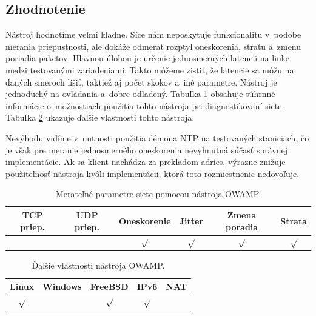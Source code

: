         \subsection{Zhodnotenie} \label{owamp_zhod}
        Nástroj hodnotíme veľmi kladne. Síce nám neposkytuje funkcionalitu
        v~podobe merania priepustnosti, ale dokáže odmerať rozptyl oneskorenia, stratu
        a~zmenu poriadia paketov. Hlavnou úlohou je určenie jednosmerných
        latencií na linke medzi testovanými zariadeniami. Takto môžeme zistiť,
        že latencie sa môžu na daných smeroch líšiť, taktiež aj počet skokov
        a~iné parametre. Nástroj je jednoduchý na ovládania a~dobre 
        odladený. Tabuľka \ref{tab_owamp_param} obsahuje súhrnné informácie
        o~možnostiach použitia tohto nástroja pri diagnostikovaní siete.
        Tabuľka \ref{tab_owamp_vlast} ukazuje ďalšie vlastnosti
        tohto nástroja.

        Nevýhodu vidíme v~nutnosti použitia démona NTP na
        testovaných staniciach, čo je však pre meranie jednosmerného
        oneskorenia nevyhnutná súčasť správnej implementácie.
        Ak sa klient nachádza za prekladom adries, výrazne znižuje použiteľnosť
        nástroja kvôli implementácii, ktorá toto rozmiestnenie nedovoľuje.

        \begin{table}[H]
            \begin{center}
                \begin{tabular}{|c|c|c|c|c|c|}
                    \hline
                    \textbf{TCP priep.}  &  \textbf{UDP priep.}  &
                    \textbf{Oneskorenie} & \textbf{Jitter} &
                    \textbf{Zmena poradia} & \textbf{Strata} \\
                    \hline
                    & & $\surd$ & $\surd$ &  $\surd$ & $\surd$\\ 
                    \hline
                \end{tabular}
                \caption{Merateľné parametre siete pomocou nástroja OWAMP.}
                \label{tab_owamp_param}
            \end{center}
        \end{table}

        \begin{table}[H]
            \begin{center}
                \begin{tabular}{|c|c|c|c|c|}
                    \hline
                    \textbf{Linux}  &  \textbf{Windows}  &
                    \textbf{FreeBSD} & \textbf{IPv6} &
                    \textbf{NAT} \\
                    \hline
                    $\surd$ & & $\surd$ & $\surd$ &  \\ 
                    \hline
                \end{tabular}
                \caption{Ďalšie vlastnosti nástroja OWAMP.}
                \label{tab_owamp_vlast}
            \end{center}
        \end{table}

